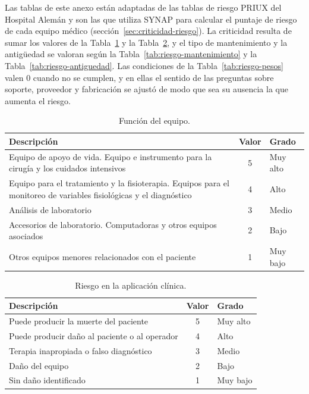 \documentclass[10pt]{article}
\begin{document}
Las tablas de este anexo están adaptadas de las tablas de riesgo PRIUX del Hospital Alemán y son las que utiliza SYNAP para calcular el puntaje de riesgo de cada equipo médico (sección~\ref{sec:criticidad-riesgo}). La criticidad resulta de sumar los valores de la Tabla~\ref{tab:riesgo-funcion} y la Tabla~\ref{tab:riesgo-clinico}, y el tipo de mantenimiento y la antigüedad se valoran según la Tabla~\ref{tab:riesgo-mantenimiento} y la Tabla~\ref{tab:riesgo-antiguedad}. Las condiciones de la Tabla~\ref{tab:riesgo-pesos} valen 0 cuando no se cumplen, y en ellas el sentido de las preguntas sobre soporte, proveedor y fabricación se ajustó de modo que sea su ausencia la que aumenta el riesgo.

\begin{table}[H]
    \caption{Función del equipo.}
    \label{tab:riesgo-funcion}
    \centering
    \small
    \renewcommand{\arraystretch}{1.3}
    \begin{tabularx}{\textwidth}{>{\raggedright\arraybackslash}X c l}
        \toprule
        \textbf{Descripción} & \textbf{Valor} & \textbf{Grado} \\
        \midrule
        Equipo de apoyo de vida. Equipo e instrumento para la cirugía y los cuidados intensivos & 5 & Muy alto \\
        Equipo para el tratamiento y la fisioterapia. Equipos para el monitoreo de variables fisiológicas y el diagnóstico & 4 & Alto \\
        Análisis de laboratorio & 3 & Medio \\
        Accesorios de laboratorio. Computadoras y otros equipos asociados & 2 & Bajo \\
        Otros equipos menores relacionados con el paciente & 1 & Muy bajo \\
        \bottomrule
    \end{tabularx}
\end{table}

\begin{table}[H]
    \caption{Riesgo en la aplicación clínica.}
    \label{tab:riesgo-clinico}
    \centering
    \small
    \renewcommand{\arraystretch}{1.3}
    \begin{tabularx}{\textwidth}{>{\raggedright\arraybackslash}X c l}
        \toprule
        \textbf{Descripción} & \textbf{Valor} & \textbf{Grado} \\
        \midrule
        Puede producir la muerte del paciente & 5 & Muy alto \\
        Puede producir daño al paciente o al operador & 4 & Alto \\
        Terapia inapropiada o falso diagnóstico & 3 & Medio \\
        Daño del equipo & 2 & Bajo \\
        Sin daño identificado & 1 & Muy bajo \\
        \bottomrule
    \end{tabularx}
\end{table}
\end{document}
